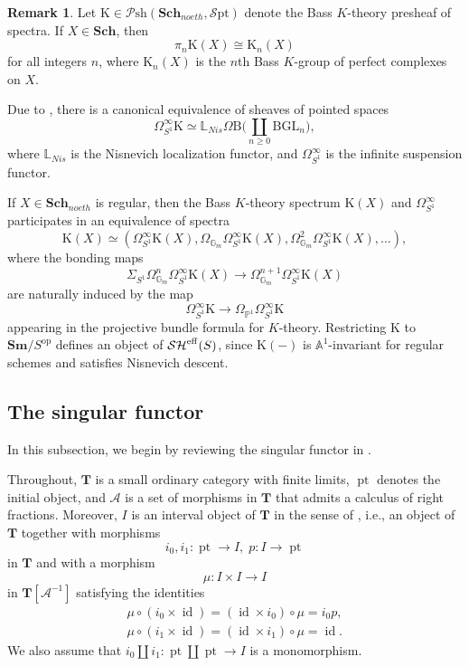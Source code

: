 \documentclass[11pt, a4paper]{amsart}
\theoremstyle{definition}
\newtheorem{rmk}[thm]{Remark}
\numberwithin{equation}{subsection}
\renewcommand{\P}{\mathbb{P}}
\newcommand{\A}{\mathbb{A}}
\newcommand{\bbL}{\mathbb{L}}
\newcommand{\Sch}{\mathbf{Sch}}
\newcommand{\Sm}{\mathbf{Sm}}
\newcommand{\id}{\operatorname{id}}   			%
\newcommand{\pt}[1]{\mathrm{\pt}_{#1}}
\newcommand{\BGL}{{\mathrm{BGL}}}
\newcommand{\Kth}{\mathrm{K}}
\newcommand{\clspace}{\mathrm{B}}
\newcommand{\cA}{\mathcal{A}}
\newcommand{\bT}{\mathbf{T}}
\def\pt{\operatorname{pt}}
\newcommand{\eff}{{\rm eff}}
\newcommand{\infPsh}{\mathcal{P}\mathrm{sh}}
\newcommand{\infSpt}{\mathcal{S}\mathrm{pt}}
\newcommand{\infSHS}{\mathcal{SH}^{\eff}}
\begin{document}
\begin{rmk}Let $\Kth\in \infPsh(\Sch_{noeth},\infSpt)$\index[notation]{Kth @ $\Kth$} 
denote the Bass $K$-theory presheaf of spectra.
If $X\in \Sch$, then
\[
\pi_{n}\Kth(X)
\cong
\Kth_n(X)
\]
for all integers $n$, where $\Kth_n(X)$ is the $n$th Bass $K$-group of perfect complexes on $X$.

Due to \cite[Propositions 3.9]{MV}, 
there is a canonical equivalence of sheaves of pointed spaces
\begin{equation}
\label{K-theory.14.1}
\Omega_{S^1}^\infty \Kth
\simeq
\bbL_{Nis} \Omega \clspace \big( \coprod_{n\geq 0} \BGL_n \big),
\end{equation}
where $\bbL_{Nis}$ is the Nisnevich localization functor, and $\Omega_{S^1}^\infty$ is the infinite suspension functor.

If $X\in \Sch_{noeth}$ is regular, 
then the Bass $K$-theory spectrum $\Kth(X)$ and $\Omega_{S^1}^\infty$ participates in an equivalence of spectra
\begin{equation}
\label{K-theory.14.2}
\Kth(X)
\simeq
(\Omega_{S^1}^\infty \Kth(X),\Omega_{\mathbb{G}_m}\Omega_{S^1}^\infty \Kth(X),\Omega_{\mathbb{G}_m}^2\Omega_{S^1}^\infty \Kth(X),\ldots),
\end{equation}
where the bonding maps
\[
\Sigma_{S^1}\Omega_{\mathbb{G}_m}^n\Omega_{S^1}^\infty \Kth(X)
\to
\Omega_{\mathbb{G}_m}^{n+1}\Omega_{S^1}^\infty \Kth(X)
\]
are naturally induced by the map
\[
\Omega_{S^1}^\infty \Kth\to \Omega_{\P^1}\Omega_{S^1}^\infty \Kth
\]
appearing in the projective bundle formula \cite[Theorem 7.3]{TT} for $K$-theory.
Restricting $\Kth$ to $\Sm/S^\mathrm{op}$ defines an object of $\infSHS(S)$, 
since $\Kth(-)$ is $\A^1$-invariant for regular schemes and satisfies Nisnevich descent.
\end{rmk}
\subsection{The singular functor}
\label{subsection:tsf}

In this subsection,
we begin by reviewing the singular functor in \cite[\S 6]{logDM}.

Throughout, 
$\bT$ is a small ordinary category with finite limits, 
$\pt$ denotes the initial object, and $\cA$ is a set of morphisms in $\bT$ that admits a calculus of right fractions.
Moreover, 
$I$ is an interval object of $\bT$ in the sense of \cite[\S 2.3]{MV},
i.e., an object of $\bT$ together with morphisms
\[
i_0,i_1\colon \pt\to I,
\;
p\colon I\to \pt
\]
in $\bT$ and with a morphism
\[
\mu\colon I\times I\to I
\]
in $\bT[\cA^{-1}]$ satisfying the identities
\begin{gather*}
\mu\circ (i_0\times \id)=(\id\times i_0)\circ \mu=i_0p,
\\
\mu\circ (i_1\times \id)=(\id\times i_1)\circ \mu=\id.
\end{gather*}
We also assume that $i_0\amalg i_1\colon \pt\amalg \pt \to I$ is a monomorphism.
\end{document}
